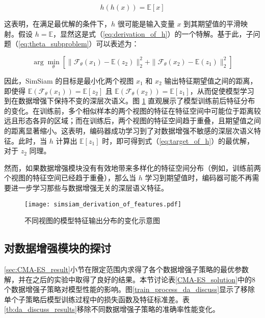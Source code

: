 \documentclass[master]{thesis-uestc}
\begin{document}
\begin{equation}
    h(h(x)) = \mathbb{E}[x]
    \label{eq:derivation_of_h}
\end{equation}

这表明，在满足最优解的条件下，$h$ 很可能是输入变量 $x$ 到其期望值的平滑映射。假设 $h = \mathbb{E}$，显然这是式（\ref{eq:derivation_of_h}）的一个特解。基于此，子问题（\ref{eq:theta_subproblem}）可以表述为：

\begin{equation}
    \arg\min_{\theta} \left[\| \mathcal{F}_{\theta}(x_1) - \mathbb{E}(z_2) \|_2^2 + \| \mathcal{F}_{\theta}(x_2) - \mathbb{E}(z_1) \|_2^2 \right]
\end{equation}

因此，SimSiam 的目标是最小化两个视图 \( x_1 \) 和 \( x_2 \) 输出特征期望值之间的距离，即使得 \( \mathbb{E}(\mathcal{F}_\theta(x_1)) = \mathbb{E}[z_2] \) 且 \( \mathbb{E}(\mathcal{F}_\theta(x_2)) = \mathbb{E}[z_1] \)，从而促使模型学习到在数据增强下保持不变的深层次语义。图 \ref{simsiam_derivation_of_features} 直观展示了模型训练前后特征分布的变化。在训练前，多个相似样本的两个视图的特征在特征空间中可能位于距离较远且形态各异的区域；而在训练后，两个视图的特征空间趋于重叠，且期望值之间的距离显著缩小。这表明，编码器成功学习到了对数据增强不敏感的深层次语义特征。此时，当 \( h \) 计算出 \( \mathbb{E}[z_1] \) 时，即可得到式（\ref{eq:target_of_h}）的最优解，对于 \( z_2 \) 同理。

然而，如果数据增强模块没有有效地带来多样化的特征空间分布（例如，训练前两个视图的特征空间已经趋于重叠），那么当 \( h \) 学习到期望值时，编码器可能不再需要进一步学习那些与数据增强无关的深层语义特征。

\begin{figure}[h]
    \centering
    \texttt{[image: simsiam\_derivation\_of\_features.pdf]}
    \caption{不同视图的模型特征输出分布的变化示意图}
    \label{simsiam_derivation_of_features}
\end{figure}

\subsection{对数据增强模块的探讨}
\ref{sec:CMA-ES_result}小节在限定范围内求得了各个数据增强子策略的最优参数解，并在之后的实验中取得了良好的结果。本节讨论表\ref{CMA-ES_solution}中的8个数据增强子策略对模型性能的影响。图\ref{train_process_da_discuss}显示了移除单个子策略后模型训练过程中的损失函数及特征标准差。表\ref{tb:da_discuss_results}移除不同数据增强子策略的准确率性能变化。
\end{document}
